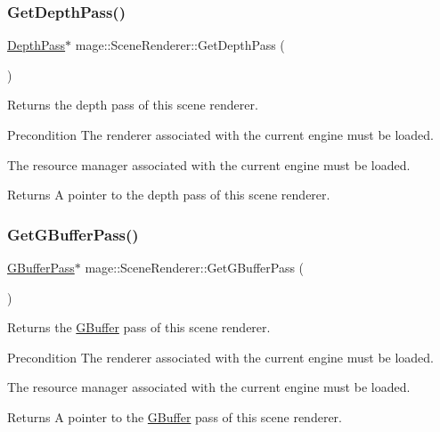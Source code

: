 \subsubsection{\texorpdfstring{Get\+Depth\+Pass()}{GetDepthPass()}}
{\footnotesize\ttfamily \hyperlink{classmage_1_1_depth_pass}{Depth\+Pass}$\ast$ mage\+::\+Scene\+Renderer\+::\+Get\+Depth\+Pass (\begin{DoxyParamCaption}{ }\end{DoxyParamCaption})}

Returns the depth pass of this scene renderer.

\begin{DoxyPrecond}{Precondition}
The renderer associated with the current engine must be loaded. 

The resource manager associated with the current engine must be loaded. 
\end{DoxyPrecond}
\begin{DoxyReturn}{Returns}
A pointer to the depth pass of this scene renderer. 
\end{DoxyReturn}
\hypertarget{classmage_1_1_scene_renderer_a5a862266e0e39235d60c905259eccb51}{}\label{classmage_1_1_scene_renderer_a5a862266e0e39235d60c905259eccb51} 
\subsubsection{\texorpdfstring{Get\+G\+Buffer\+Pass()}{GetGBufferPass()}}
{\footnotesize\ttfamily \hyperlink{classmage_1_1_g_buffer_pass}{G\+Buffer\+Pass}$\ast$ mage\+::\+Scene\+Renderer\+::\+Get\+G\+Buffer\+Pass (\begin{DoxyParamCaption}{ }\end{DoxyParamCaption})}

Returns the \hyperlink{structmage_1_1_g_buffer}{G\+Buffer} pass of this scene renderer.

\begin{DoxyPrecond}{Precondition}
The renderer associated with the current engine must be loaded. 

The resource manager associated with the current engine must be loaded. 
\end{DoxyPrecond}
\begin{DoxyReturn}{Returns}
A pointer to the \hyperlink{structmage_1_1_g_buffer}{G\+Buffer} pass of this scene renderer. 
\end{DoxyReturn}
\hypertarget{classmage_1_1_scene_renderer_a9bd8910a13b4711e90bdd689df8b4854}{}\label{classmage_1_1_scene_renderer_a9bd8910a13b4711e90bdd689df8b4854} 
